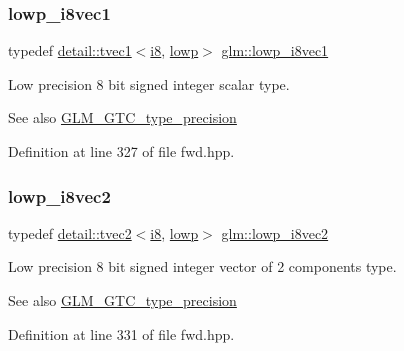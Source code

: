 \subsubsection{\texorpdfstring{lowp\+\_\+i8vec1}{lowp\_i8vec1}}
{\footnotesize\ttfamily typedef \hyperlink{structglm_1_1detail_1_1tvec1}{detail\+::tvec1}$<$\hyperlink{group__gtc__type__precision_gaae064be68b7d36cd7910c16e8ad18bba}{i8}, \hyperlink{namespaceglm_a0f04f086094c747d227af4425893f545ae161af3fc695e696ce3bf69f7332bc2d}{lowp}$>$ \hyperlink{group__gtc__type__precision_ga490ff77964d0386c1db936eb2a324988}{glm\+::lowp\+\_\+i8vec1}}

Low precision 8 bit signed integer scalar type. \begin{DoxySeeAlso}{See also}
\hyperlink{group__gtc__type__precision}{G\+L\+M\+\_\+\+G\+T\+C\+\_\+type\+\_\+precision} 
\end{DoxySeeAlso}


Definition at line 327 of file fwd.\+hpp.

\mbox{\label{group__gtc__type__precision_ga511280c8869c7c79bba3c359f37f5559}} 
\subsubsection{\texorpdfstring{lowp\+\_\+i8vec2}{lowp\_i8vec2}}
{\footnotesize\ttfamily typedef \hyperlink{structglm_1_1detail_1_1tvec2}{detail\+::tvec2}$<$\hyperlink{group__gtc__type__precision_gaae064be68b7d36cd7910c16e8ad18bba}{i8}, \hyperlink{namespaceglm_a0f04f086094c747d227af4425893f545ae161af3fc695e696ce3bf69f7332bc2d}{lowp}$>$ \hyperlink{group__gtc__type__precision_ga511280c8869c7c79bba3c359f37f5559}{glm\+::lowp\+\_\+i8vec2}}

Low precision 8 bit signed integer vector of 2 components type. \begin{DoxySeeAlso}{See also}
\hyperlink{group__gtc__type__precision}{G\+L\+M\+\_\+\+G\+T\+C\+\_\+type\+\_\+precision} 
\end{DoxySeeAlso}


Definition at line 331 of file fwd.\+hpp.

\mbox{\label{group__gtc__type__precision_ga048811f03c327d4b56564a72d98800e8}} 
